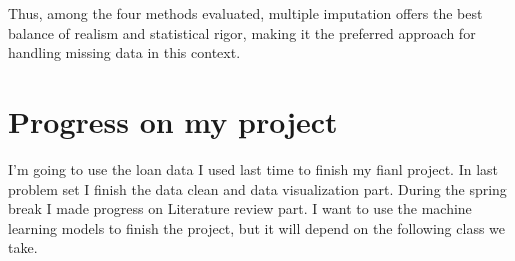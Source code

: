 \documentclass{article}
\begin{document}
Thus, among the four methods evaluated, multiple imputation offers the best balance of realism and statistical rigor, making it the preferred approach for handling missing data in this context.

\section{Progress on my project}
I'm going to use the loan data I used last time to finish my fianl project. In last problem set I finish the data clean and data visualization part. During the spring break I made progress on Literature review part. I want to use the machine learning models to finish the project, but it will depend on the following class we take. 
\end{document}
